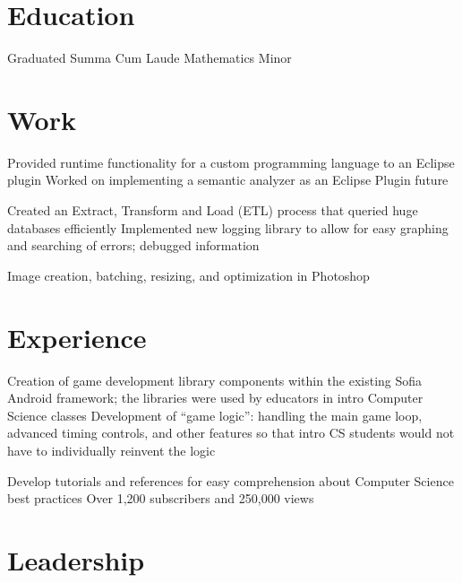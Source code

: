 \documentclass{my_cv}
\begin{document}

\section{Education}
\workitemstwo
{Graduated Summa Cum Laude }
{Mathematics Minor}
 
\section{Work}
\workitemstwo
{Provided runtime functionality for a custom programming language to an Eclipse plugin}
{Worked on implementing a semantic analyzer as an Eclipse Plugin future}

\workitemstwo
{Created an Extract, Transform and Load (ETL) process that queried huge databases efficiently  }
{Implemented new logging library to allow for easy graphing and searching of errors; debugged information}

\workitemsone
{Image creation, batching, resizing, and optimization in Photoshop}

\section{Experience}
\workitemstwo
{Creation of game development library components within the existing Sofia Android framework; the libraries were used by educators in intro Computer Science classes }
{Development of “game logic”: handling the main game loop, advanced timing controls, and other features so that intro CS students would not have to individually reinvent the logic}

\workitemstwo
{Develop tutorials and references for easy comprehension about Computer Science best practices }
{Over 1,200 subscribers and 250,000 views}

\section{Leadership}
\end{document}
